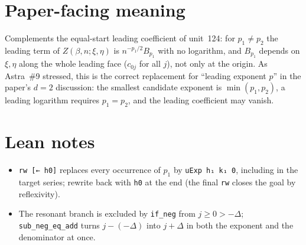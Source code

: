 \documentclass[11pt]{article}
\begin{document}
\section{Paper-facing meaning}

Complements the equal-start leading coefficient of unit~124: for $p_1\ne p_2$ the leading term of
$Z(\beta,n;\xi,\eta)$ is $n^{-p_1/2}B_{p_1}$ with no logarithm, and $B_{p_1}$ depends on
$\xi,\eta$ along the whole leading face ($c_{0j}$ for all $j$), not only at the origin. As Astra~\#9
stressed, this is the correct replacement for ``leading exponent $p$'' in the paper's $d=2$
discussion: the smallest candidate exponent is $\min(p_1,p_2)$, a leading logarithm requires
$p_1=p_2$, and the leading coefficient may vanish.

\section{Lean notes}

\begin{itemize}
\item \texttt{rw [← h0]} replaces every occurrence of $p_1$ by \texttt{uExp h₁ k₁ 0}, including in
the target series; rewrite back with \texttt{h0} at the end (the final \texttt{rw} closes the goal by
reflexivity).
\item The resonant branch is excluded by \texttt{if\_neg} from $j\ge0>-\Delta$;
\texttt{sub\_neg\_eq\_add} turns $j-(-\Delta)$ into $j+\Delta$ in both the exponent and the
denominator at once.
\end{itemize}
\end{document}
